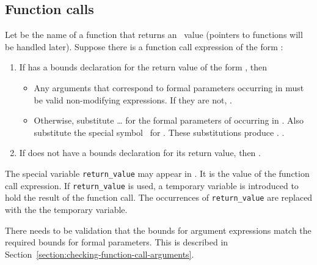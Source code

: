 \subsection{Function calls}
\label{section:inferring-bounds-for-function-calls}

Let  be the name of a function that returns an
\arrayptr\ value (pointers to functions will be handled later).
Suppose there is a function call expression of the form
\code{(}\code{)}:

\begin{enumerate}
\item
  If  has a bounds declaration for the return value of the form
   , then

  \begin{itemize}
  \item
    Any arguments that correspond to formal parameters occurring in
     must be valid non-modifying expressions. If they are
    not, .
  \item
    Otherwise, substitute  \ldots{}  for the formal
    parameters of  occurring in . Also substitute the
    special symbol \exprcurrentvalue\ for
    . These substitutions produce .
    .
  \end{itemize}
\item
  If  does not have a bounds declaration for its return value,
  then .
\end{enumerate}

The special variable \lstinline|return_value| may appear in . It
is the value of the function call expression. If \lstinline|return_value|
is used, a temporary variable is introduced to hold the result of the
function call.  The occurrences of \lstinline|return_value| are replaced
with the the temporary variable.

There needs to be validation that the bounds for argument expressions
match the required bounds for formal parameters. This is described in
Section~\ref{section:checking-function-call-arguments}.

